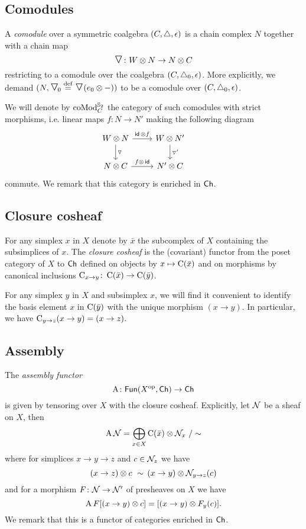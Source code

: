 \subsection{Comodules}

A \textit{comodule} over a symmetric coalgebra $(C, \triangle, \operatorname{\epsilon})$ is a chain complex $N$ together with a chain map
\[
\text{\Large$\triangledown$} \colon W \otimes N \to N \otimes C
\]
restricting to a comodule over the coalgebra $(C, \triangle_0, \operatorname{\epsilon})$.
More explicitly, we demand $(N, \text{\Large$\triangledown$}_{\!0} \stackrel{\mathrm{def}}{=} \text{\Large$\triangledown$}(e_0 \otimes -))$ to be a comodule over $(C, \triangle_0, \operatorname{\epsilon})$.

We will denote by $\operatorname{coMod}_C^{\mathbb{S}_2}$ the category of such comodules with strict morphisms, i.e. linear maps $f \colon N \to N'$ making the following diagram
\[
\begin{tikzcd}
	W \ot N \arrow[d, "\triangledown"] \arrow[r, "\id\, \ot f"] &
	W \ot N' \arrow[d, "\triangledown'"] & \\
	N \ot C \arrow[r, "f \ot\, \id"] &
	N' \ot C
\end{tikzcd}
\]
commute.
We remark that this category is enriched in $\mathsf{Ch}$.

\subsection{Closure cosheaf}

For any simplex $x$ in $X$ denote by $\bar x$ the subcomplex of $X$ containing the subsimplices of $x$.
The \textit{closure cosheaf} is the (covariant) functor from the poset category of $X$ to $\mathsf{Ch}$ defined on objects by $x \mapsto \operatorname{C}(\bar x)$ and on morphisms by canonical inclusions $\operatorname{C}_{x \to y} \colon \operatorname{C}(\bar x) \to \operatorname{C}(\bar y)$.

For any simplex $y$ in $X$ and subsimplex $x$, we will find it convenient to identify the basis element $x$ in $\operatorname{C}(\bar y)$ with the unique morphism $(x \to y)$.
In particular, we have $\operatorname{C}_{y \to z} (x \to y) = (x \to z)$.

\subsection{Assembly}\label{ss:assembly}

The \textit{assembly functor}
\[
\operatorname{A} \colon \mathsf{Fun}(X^{\mathrm{op}}, \mathsf{Ch}) \to \mathsf{Ch}
\]
is given by tensoring over $X$ with the closure cosheaf.
Explicitly, let $\mathcal{N}$ be a sheaf on $X$, then
\[
\operatorname{A} \mathcal{N} = \bigoplus_{x \in X} \operatorname{C}(\bar x) \otimes \mathcal{N}_x \ / \sim
\]
where for simplices $x \to y \to z$ and $c \in \mathcal{N}_z$ we have
\[
(x \to z) \otimes c \ \sim \, (x \to y) \otimes \mathcal{N}_{y \to z}(c)
\]
and for a morphism $F \colon \mathcal{N} \to \mathcal{N}'$ of presheaves on $X$ we have
\[
\operatorname{A} F[(x \to y) \otimes c] = [(x \to y) \otimes F_y(c)].
\]
We remark that this is a functor of categories enriched in $\mathsf{Ch}$.

